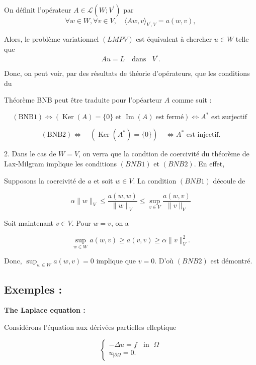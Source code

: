 \begin{remark}\
	
	
On définit l'opérateur  $A \in \mathcal{L}\left(W ; V^{\prime}\right)$ par 
	$$
	\forall w \in W, \forall v \in V, \quad\langle A w, v\rangle_{V^{\prime}, V}=a(w, v),
	$$
	

	 
	Alors,  le problème variationnel $(LMPV)$ est équivalent   à chercher  $u \in W$ telle que  
	$$
	A u=L\quad \text{dans }\;\; V^{\prime}.
	$$ 
	
Donc, on peut voir, par des résultats de théorie d'opérateurs, que les conditions du 

Théorème BNB peut être traduite pour l'opéarteur $A$ comme suit :


	$$
	(\mathrm{BNB} 1) \Longleftrightarrow(\operatorname{Ker}(A)=\{0\}   \text{ et } \operatorname{Im}(A)  \; \text{est fermé} ) \Longleftrightarrow A^{*} \text{ est   surjectif }
	$$ 
	
	$$
	(\mathrm{BNB} 2) \Longleftrightarrow \quad\left(\operatorname{Ker}\left(A^{*}\right)=\{0\}\right) \quad \Longleftrightarrow A^{*}  \text{  est  injectif}.
	$$
	
2.  Dans le cas  de  $W=V$, on verra que la condtion de coercivité  du théorème de  Lax-Milgram implique les conditions $(BNB1)$ et $(BNB2)$. En effet, 
	
 Supposons la coercivité de $a$ et soit  $w \in V$.  La condition $(BNB1)$ découle de 
 
$$
\alpha\|w\|_{V} \leq \frac{a(w, w)}{\|w\|_{V}} \leq \sup _{v \in V} \frac{a(w, v)}{\|v\|_{V}}
$$

Soit maintenant $v \in V$.  Pour $w=v$, on a  

$$
\sup _{w \in W} a(w, v) \geq a(v, v) \geq \alpha\|v\|_{V}^{2}. 
$$

Donc, $\displaystyle \sup _{w \in W} a(w, v)=0$ implique  que $v=0$.  D'où  $(BNB2)$ est démontré.
\end{remark}

\subsection{Exemples : }

{\bf The Laplace equation :} 

Considérons l'équation aux dérivées partielles elleptique

\begin{equation}
	\begin{cases}
		-\Delta u=f \;\; \text{ in }\; \Omega\\
		u_{\mid \partial \Omega}=0.
	\end{cases}
\end{equation}

